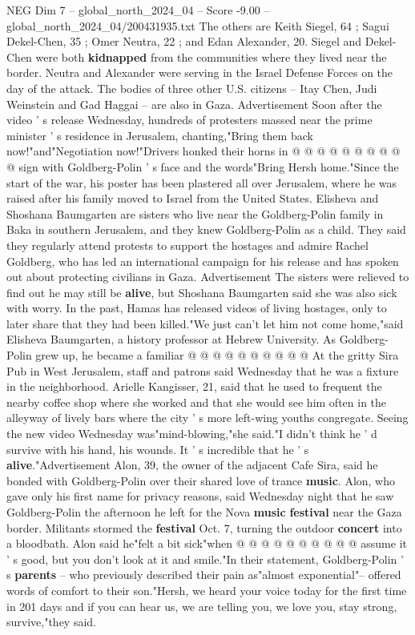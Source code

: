 \begin{textsample}{NEG Dim 7 – global\_north\_2024\_04 – Score -9.00 – global\_north\_2024\_04/200431935.txt}
The others are Keith Siegel, 64 ; Sagui Dekel-Chen, 35 ; Omer Neutra, 22 ; and Edan Alexander, 20.
Siegel and Dekel-Chen were both \textbf{kidnapped} from the communities where they lived near the border.
Neutra and Alexander were serving in the Israel Defense Forces on the day of the attack.
The bodies of three other U.S. citizens -- Itay Chen, Judi Weinstein and Gad Haggai -- are also in Gaza.
Advertisement Soon after the video ' s release Wednesday, hundreds of protesters massed near the prime minister ' s residence in Jerusalem, chanting,"Bring them back now!"and"Negotiation now!"Drivers honked their horns in @ @ @ @ @ @ @ @ @ @ sign with Goldberg-Polin ' s face and the words"Bring Hersh home."Since the start of the war, his poster has been plastered all over Jerusalem, where he was raised after his family moved to Israel from the United States.
Elisheva and Shoshana Baumgarten are sisters who live near the Goldberg-Polin family in Baka in southern Jerusalem, and they knew Goldberg-Polin as a child.
They said they regularly attend protests to support the hostages and admire Rachel Goldberg, who has led an international campaign for his release and has spoken out about protecting civilians in Gaza.
Advertisement The sisters were relieved to find out he may still be \textbf{alive}, but Shoshana Baumgarten said she was also sick with worry.
In the past, Hamas has released videos of living hostages, only to later share that they had been killed."We just can't let him not come home,"said Elisheva Baumgarten, a history professor at Hebrew University.
As Goldberg-Polin grew up, he became a familiar @ @ @ @ @ @ @ @ @ @ At the gritty Sira Pub in West Jerusalem, staff and patrons said Wednesday that he was a fixture in the neighborhood.
Arielle Kangisser, 21, said that he used to frequent the nearby coffee shop where she worked and that she would see him often in the alleyway of lively bars where the city ' s more left-wing youths congregate.
Seeing the new video Wednesday was"mind-blowing,"she said."I didn't think he ' d survive with his hand, his wounds.
It ' s incredible that he ' s \textbf{alive}."Advertisement Alon, 39, the owner of the adjacent Cafe Sira, said he bonded with Goldberg-Polin over their shared love of trance \textbf{music}.
Alon, who gave only his first name for privacy reasons, said Wednesday night that he saw Goldberg-Polin the afternoon he left for the Nova \textbf{music} \textbf{festival} near the Gaza border.
Militants stormed the \textbf{festival} Oct. 7, turning the outdoor \textbf{concert} into a bloodbath.
Alon said he"felt a bit sick"when @ @ @ @ @ @ @ @ @ @ assume it ' s good, but you don't look at it and smile."In their statement, Goldberg-Polin ' s \textbf{parents} -- who previously described their pain as"almost exponential"-- offered words of comfort to their son."Hersh, we heard your voice today for the first time in 201 days and if you can hear us, we are telling you, we love you, stay strong, survive,"they said.

\end{textsample}
